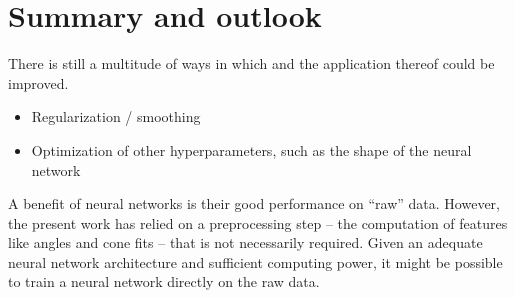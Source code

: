 \chapter{Summary and outlook}

There is still a multitude of ways in which \dsea{} and the application thereof could be improved.
\begin{itemize}
  \item Regularization / smoothing
  \item Optimization of other hyperparameters, such as the shape of the neural network
\end{itemize}

A benefit of neural networks is their good performance on \enquote{raw} data.
However,
the present work has relied on a preprocessing step %
  – the computation of features like angles and cone fits –
that is not necessarily required.
Given an adequate neural network architecture and sufficient computing power,
it might be possible to train a neural network directly on the raw data.


\blindtext[3]
